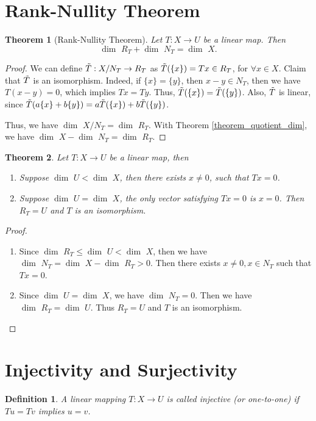 \documentclass[11pt]{book}
\newtheorem{definition}{Definition}[chapter]
\newtheorem{theorem}{Theorem}[chapter]
\theoremstyle{definition}
\numberwithin{equation}{chapter}
\begin{document}
\section{Rank-Nullity Theorem}
\begin{theorem}[Rank-Nullity Theorem]
Let $T:X\to U$ be a linear map. Then $$ \dim \,\,R_T +  \dim \,\,N_T =  \dim \,\, X.$$
\end{theorem}
\begin{proof}
We can define $\Tilde{T}:X/N_T\to R_T$ as $\Tilde{T}(\{x\}) = Tx \in R_T$, for $\forall x\in X$. Claim that $\Tilde{T}$ is an isomorphism. Indeed, if $\{x\} = \{y\}$, then $x-y\in N_T$, then we have $T(x-y) = 0$, which implies $Tx = Ty$. Thus, $\Tilde{T}(\{x\}) = \Tilde{T}(\{y\})$. Also, $\Tilde{T}$ is linear, since $\Tilde{T}(a\{x\} + b\{y\}) = a\Tilde{T}(\{x\}) + b\Tilde{T}(\{y\})$. 

Thus, we have $ \dim \,\, X/N_T =  \dim \,\, R_T$. With Theorem \ref{theorem_quotient_dim}, we have $ \dim \,\,X -  \dim \,\,N_T =  \dim \,\, R_T$.
\end{proof}

\medskip

\begin{theorem}\label{one_to_one_theorem}
Let $T:X\to U$ be a linear map, then
\begin{enumerate}[label=(\alph*)]
    \item Suppose $ \dim \,\,U <  \dim \,\, X$, then there exists $x\neq 0$, such that $T x = 0$.
    \item Suppose $ \dim \,\,U =  \dim \,\, X$, the only vector satisfying $T x = 0$ is $x= 0$. Then $R_T = U$ and $T$ is an isomorphism.
\end{enumerate}
\end{theorem}
\begin{proof}
~\begin{enumerate}[label=(\alph*)]
    \item Since $ \dim \,\,R_T \leq  \dim \,\, U <  \dim \,\, X$, then we have $ \dim \,\, N_T =  \dim \,\,X -  \dim \,\,R_T > 0$. Then there exists $x \neq 0, x\in N_T$ such that $T x = 0$.
    \item Since $ \dim \,\,U =  \dim \,\, X$, we have $ \dim \,\,N_T = 0$. Then we have $ \dim \,\,R_T =  \dim \,\,U$. Thus $R_T = U$ and $T$ is an isomorphism.
\end{enumerate}
\end{proof}

\medskip

\section{Injectivity and Surjectivity}
\begin{definition}
A linear mapping $T:X\to U$ is called injective (or one-to-one) if $Tu = Tv$ implies $u = v$.
\end{definition}
\end{document}
